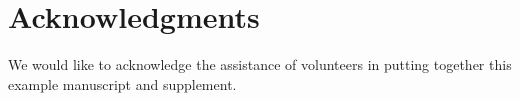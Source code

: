 \section*{Acknowledgments}
We would like to acknowledge the assistance of volunteers in putting
together this example manuscript and supplement.